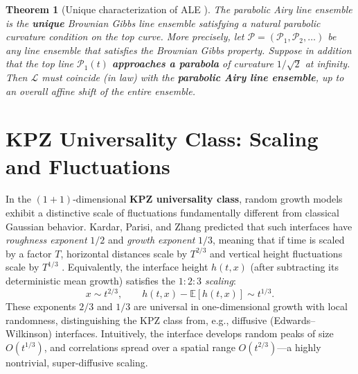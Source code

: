 \documentclass[letterpaper,11pt,oneside,reqno]{article}
\numberwithin{equation}{section}
\newtheorem{theorem}[proposition]{Theorem}
\theoremstyle{definition}
\begin{document}
\begin{theorem}[Unique characterization of ALE \cite{AggarwalHuang2023Characterization}]
	The parabolic Airy line ensemble is the \textbf{unique} Brownian Gibbs line ensemble satisfying a natural parabolic curvature condition on the top curve. More precisely, let $\boldsymbol{\mathcal{P}}=(\mathcal{P}_1,\mathcal{P}_2,\ldots)$ be any line ensemble that satisfies the Brownian Gibbs property. Suppose in addition that the top line $\mathcal{P}_1(t)$ \textbf{approaches a parabola} of curvature $1/\sqrt{2}$ at infinity. Then $\boldsymbol{\mathcal{L}}$ must coincide (in law) with the \textbf{parabolic Airy line ensemble}, up to an overall affine shift of the entire ensemble.
\end{theorem}





\section{KPZ Universality Class: Scaling and Fluctuations}

In the $(1+1)$-dimensional \textbf{KPZ universality class}, random growth models exhibit a distinctive scale of fluctuations fundamentally different from classical Gaussian behavior. Kardar, Parisi, and Zhang predicted that such interfaces have \emph{roughness exponent} $1/2$ and \emph{growth exponent} $1/3$, meaning that if time is scaled by a factor $T$, horizontal distances scale by $T^{2/3}$ and vertical height fluctuations scale by $T^{1/3}$ \cite{remenik2023integrable}. Equivalently, the interface height $h(t,x)$ (after subtracting its deterministic mean growth) satisfies the \emph{$1:2:3$ scaling}:
\[ x \sim t^{2/3}, \qquad h(t,x)-\mathbb{E}[h(t,x)] \sim t^{1/3}. \]
These exponents $2/3$ and $1/3$ are universal in one-dimensional growth with local randomness, distinguishing the KPZ class from, e.g., diffusive (Edwards–Wilkinson) interfaces. Intuitively, the interface develops random peaks of size $O(t^{1/3})$, and correlations spread over a spatial range $O(t^{2/3})$—a highly nontrivial, super-diffusive scaling.
\end{document}
